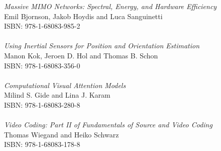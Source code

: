 \vspace{12pt}
\noindent \textit{Massive MIMO Networks: Spectral, Energy, and Hardware Efficiency}\\
Emil Bjornson, Jakob Hoydis and Luca Sanguinetti\\
ISBN: 978-1-68083-985-2\\
\\
\noindent \textit{Using Inertial Sensors for Position and Orientation Estimation}\\
Manon Kok, Jeroen D. Hol and Thomas B. Schon\\
ISBN: 978-1-68083-356-0\\
\\
\noindent \textit{Computational Visual Attention Models}\\
Milind S. Gide and Lina J. Karam\\
ISBN: 978-1-68083-280-8\\
\\
\noindent \textit{Video Coding: Part II of Fundamentals of Source and Video Coding}\\
Thomas Wiegand and Heiko Schwarz\\
ISBN: 978-1-68083-178-8
